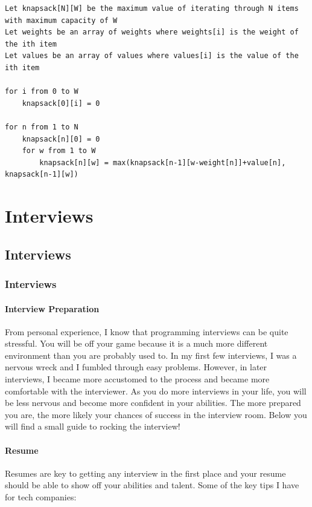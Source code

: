 \documentclass[11pt,oneside]{book}
\begin{document}
\begin{lstlisting}
Let knapsack[N][W] be the maximum value of iterating through N items with maximum capacity of W
Let weights be an array of weights where weights[i] is the weight of the ith item
Let values be an array of values where values[i] is the value of the ith item

for i from 0 to W
    knapsack[0][i] = 0

for n from 1 to N
    knapsack[n][0] = 0
    for w from 1 to W
        knapsack[n][w] = max(knapsack[n-1][w-weight[n]]+value[n], knapsack[n-1][w])
\end{lstlisting}

\part{ Interviews }
    \chapter{ Interviews }
        \section{ Interviews }
        \subsection{Interview Preparation}

From personal experience, I know that programming interviews can be quite stressful. 
    You will be off your game because it is a much more different environment than 
    you are probably used to. In my first few interviews, I was a nervous wreck and I fumbled
    through easy problems.
    However, in later interviews, I became more accustomed to the process and became more 
    comfortable with the interviewer. As you do more interviews in your life, you will be
    less nervous and become more confident in your abilities. The more prepared you are, the 
    more likely your chances of success in the interview room. Below you will find a small guide
    to rocking the interview!

\subsection{Resume}

Resumes are key to getting any interview in the first place and your resume should be able to show off your abilities and talent. Some of the key tips I have for tech companies:
\end{document}
